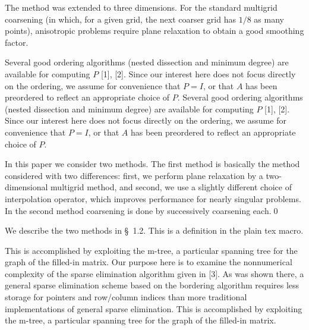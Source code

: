 
 The method  was extended to three
dimensions. For the standard multigrid
coarsening
(in which, for a given grid, the next coarser grid has $1/8$
as many points), anisotropic problems require plane
relaxation to
obtain a good smoothing factor.\endthm 

Several good ordering algorithms (nested dissection and minimum degree)
are available for computing $P$  [1], [2].
Since our interest here does not
focus directly on the ordering, we assume for convenience that $P=I$,
or that $A$ has been preordered to reflect an appropriate choice of $P$.
Several good ordering algorithms (nested dissection and minimum degree)
are available for computing $P$  [1], [2].
Since our interest here does not
focus directly on the ordering, we assume for convenience that $P=I$,
or that $A$ has been preordered to reflect an appropriate choice of $P$.


 In this paper we consider two methods. The first method
is
basically the method considered with two differences:
first, we perform plane relaxation by a two-dimensional
multigrid method, and second, we use a slightly different
choice of
interpolation operator, which improves performance
for nearly singular problems. In the second method coarsening
is done by successively coarsening each.\qed\endprf


We describe the two methods in \S\ 1.2. This is a 
definition in the plain tex macro.\enddfn 

This is accomplished by exploiting the m-tree,
a particular spanning tree for the graph of the filled-in matrix.
Our purpose here is to examine the nonnumerical complexity of the
sparse elimination algorithm given in  [3].
As was shown there, a general sparse elimination scheme based on the
bordering algorithm requires less storage for pointers and
row/column indices than more traditional implementations of general
sparse elimination. This is accomplished by exploiting the m-tree,
a particular spanning tree for the graph of the filled-in matrix.


